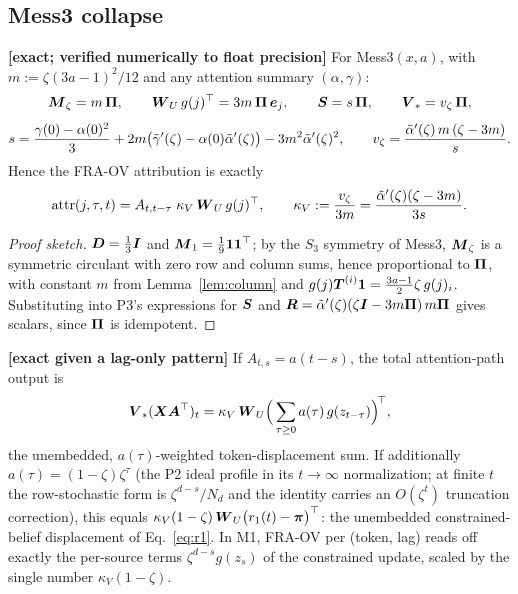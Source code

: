 \documentclass{article}
\begin{document}
\subsection{Mess3 collapse}

\begin{prop}\label{prop:mess3}
\textbf{[exact; verified numerically to float precision]} For Mess3$(x,a)$, with $m := \zeta(3a-1)^2/12$ and any attention summary $(\alpha, \gamma)$:
\begin{equation}
    \boldsymbol{M}_\zeta = m\,\boldsymbol{\Pi}, \qquad
    \boldsymbol{W}_U\,g(j)^\top = 3m\,\boldsymbol{\Pi}\,\boldsymbol{e}_j, \qquad
    \boldsymbol{S} = s\,\boldsymbol{\Pi}, \qquad
    \boldsymbol{V}_* = v_\zeta\,\boldsymbol{\Pi} ,
\end{equation}
\begin{equation}
    s = \frac{\gamma(0) - \alpha(0)^2}{3} + 2m\big(\Tilde{\gamma}'(\zeta) - \alpha(0)\Tilde{\alpha}'(\zeta)\big) - 3m^2\Tilde{\alpha}'(\zeta)^2,
    \qquad
    v_\zeta = \frac{\Tilde{\alpha}'(\zeta)\, m\,(\zeta - 3m)}{s} .
\end{equation}
Hence the FRA-OV attribution is exactly
\begin{equation}\label{eq:mess3attr}
    \mathrm{attr}(j, \tau, t) = A_{t, t-\tau}\;\kappa_V\,\boldsymbol{W}_U\,g(j)^\top ,
    \qquad
    \kappa_V := \frac{v_\zeta}{3m} = \frac{\Tilde{\alpha}'(\zeta)(\zeta - 3m)}{3s} .
\end{equation}
\end{prop}
\begin{proof}[Proof sketch]
$\boldsymbol{D} = \tfrac13\boldsymbol{I}$ and $\boldsymbol{M}_1 = \tfrac19\boldsymbol{1}\boldsymbol{1}^\top$; by the $S_3$ symmetry of Mess3, $\boldsymbol{M}_\zeta$ is a symmetric circulant with zero row and column sums, hence proportional to $\boldsymbol{\Pi}$, with constant $m$ from Lemma~\ref{lem:column} and $g(j)\boldsymbol{T}^{(i)}\boldsymbol{1} = \tfrac{3a-1}{2}\zeta\, g(j)_i$. Substituting into P3's expressions for $\boldsymbol{S}$ and $\boldsymbol{R} = \Tilde{\alpha}'(\zeta)(\zeta\boldsymbol{I} - 3m\boldsymbol{\Pi})\, m\boldsymbol{\Pi}$ gives scalars, since $\boldsymbol{\Pi}$ is idempotent.
\end{proof}

\begin{corollary}\label{cor:constrained}
\textbf{[exact given a lag-only pattern]} If $A_{t,s} = a(t-s)$, the total attention-path output is
\begin{equation}
    \boldsymbol{V}_*(\boldsymbol{X}\boldsymbol{A}^\top)_t = \kappa_V\,\boldsymbol{W}_U\Big(\sum_{\tau\ge0} a(\tau)\, g(z_{t-\tau})\Big)^{\!\top} ,
\end{equation}
the unembedded, $a(\tau)$-weighted token-displacement sum. If additionally $a(\tau) = (1-\zeta)\zeta^\tau$ (the P2 ideal profile in its $t \to \infty$ normalization; at finite $t$ the row-stochastic form is $\zeta^{d-s}/N_d$ and the identity carries an $O(\zeta^t)$ truncation correction), this equals $\kappa_V(1-\zeta)\,\boldsymbol{W}_U\big(r_1(t) - \boldsymbol{\pi}\big)^\top$: the unembedded constrained-belief displacement of Eq.~\eqref{eq:r1}. In M1, FRA-OV per (token, lag) reads off exactly the per-source terms $\zeta^{d-s} g(z_s)$ of the constrained update, scaled by the single number $\kappa_V(1-\zeta)$.
\end{corollary}
\end{document}
